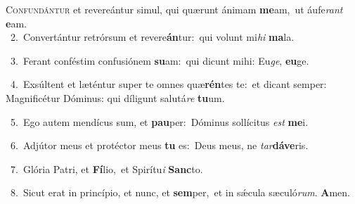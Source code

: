 \lettrine{\initial\textcolor{\initialcolor}{C}}{onfundántur} et revereántur simul, qui quærunt ánimam \textbf{me}\-am,~\star ut áufe\textit{rant} \textbf{e}\-am.\\
{\numbfont\textcolor{\numbcolor}{~2.}}~Convertántur retrórsum et revere\-\textbf{án}\-tur:~\star qui volunt mi\textit{hi} \textbf{ma}\-la.\par
{\numbfont\textcolor{\numbcolor}{~3.}}~Ferant conféstim confusiónem \textbf{su}\-am:~\star qui dicunt mihi: Eu\-\textit{ge}\-, \textbf{eu}\-ge.\par
{\numbfont\textcolor{\numbcolor}{~4.}}~Exsúltent et læténtur super te omnes quæ\-\textbf{rén}\-tes te:~\star et dicant semper: Magnificétur Dóminus: qui díligunt salutá\textit{re} \textbf{tu}\-um.\par
{\numbfont\textcolor{\numbcolor}{~5.}}~Ego autem mendícus sum, et \textbf{pau}\-per:~\star Dóminus sollícitus \textit{est} \textbf{me}\-i.\par
{\numbfont\textcolor{\numbcolor}{~6.}}~Adjútor meus et protéctor meus \textbf{tu} es:~\star Deus meus, ne \textit{tar}\-\textbf{dá}\textbf{ve}ris.\par
{\numbfont\textcolor{\numbcolor}{~7.}}~Glória Patri, et \textbf{Fí}\-lio,~\star et Spirítu\textit{i} \textbf{Sanc}\-to.\par
{\numbfont\textcolor{\numbcolor}{~8.}}~Sicut erat in princípio, et nunc, et \textbf{sem}\-per,~\star et in sǽcula sæculó\-\textit{rum}\-. \textbf{A}\-men.\par
